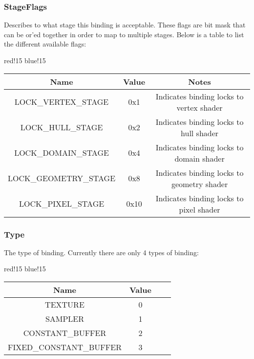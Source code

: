 \subsubsection{StageFlags}
Describes to what stage this binding is acceptable. These flags are bit mask that can be or'ed together in order to map to multiple stages. Below is a table to list the different available flags:
\begin{center}
    {
        {red!15}
        {blue!15}
        \begin{tabular}{|c|c|c|}
            \hline
            \textbf{Name} & \textbf{Value} & \textbf{Notes} \\
    
            \hline\hline
            LOCK\_VERTEX\_STAGE & 0x1 & Indicates binding locks to vertex shader \\
            LOCK\_HULL\_STAGE & 0x2 & Indicates binding locks to hull shader \\
            LOCK\_DOMAIN\_STAGE & 0x4 & Indicates binding locks to domain shader \\
            LOCK\_GEOMETRY\_STAGE & 0x8 & Indicates binding locks to geometry shader \\
            LOCK\_PIXEL\_STAGE & 0x10 & Indicates binding locks to pixel shader \\
            \hline
        \end{tabular}
    }
\end{center}

\subsubsection{Type}
The type of binding. Currently there are only 4 types of binding:
\begin{center}
    {
        {red!15}
        {blue!15}
        \begin{tabular}{|c|c|c|c|}
            \hline
            \textbf{Name} & \textbf{Value} \\

            \hline\hline
            TEXTURE & 0 \\
            SAMPLER & 1 \\
            CONSTANT\_BUFFER & 2 \\
            FIXED\_CONSTANT\_BUFFER & 3 \\
            \hline
        \end{tabular}
    }
\end{center}

